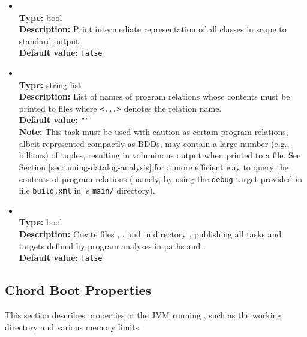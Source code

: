 \begin{itemize}
\item
{} \\
{\bf Type:} bool \\
{\bf Description:} Print intermediate representation of all classes in scope to standard output. \\
{\bf Default value:} {\tt false}

\item
{} \\
{\bf Type:} string list \\
{\bf Description:} List of names of program relations whose contents must be printed to files  where {\tt <...>} denotes the relation name. \\
{\bf Default value:} {\tt ""} \\
{\bf Note:} This task must be used with caution as certain program relations, albeit represented compactly as BDDs, may contain a large number (e.g., billions) of tuples, resulting in voluminous output when printed to a file.  See Section \ref{sec:tuning-datalog-analysis} for a more efficient way to query the contents of program relations (namely, by using the {\tt debug} target provided in file {\tt build.xml} in \Chord's {\tt main/} directory).

\item
{} \\
{\bf Type:} bool \\
{\bf Description:} Create files , , and  in directory , publishing all tasks and targets defined by program analyses in paths  and . \\
{\bf Default value:} {\tt false}
\end{itemize}

\subsection{Chord Boot Properties}

This section describes properties of the JVM running \Chord, such as the working directory and various memory limits.
 

